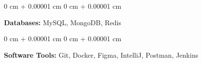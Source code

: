 \documentclass[10pt, letterpaper]{article}
\newenvironment{onecolentry}{
    \begin{adjustwidth}{
        0 cm + 0.00001 cm
    }{
        0 cm + 0.00001 cm
    }
}{
    \end{adjustwidth}
}
\begin{document}
        \vspace{0.1 cm}
        
        \begin{onecolentry}
        \textbf{Databases:} MySQL, MongoDB, Redis \  %
        \end{onecolentry}
        
        \vspace{0.1 cm}
        
        \begin{onecolentry}
        \textbf{Software Tools:} Git, Docker, Figma, IntelliJ, Postman, Jenkins \\  %
        \vspace{0.1 cm}
        \end{onecolentry}


    
\end{document}
